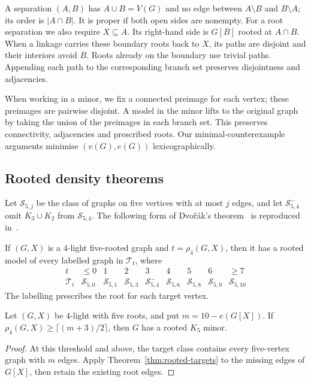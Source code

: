 A separation $(A,B)$ has $A\cup B=V(G)$ and no edge between
$A\setminus B$ and $B\setminus A$; its order is $|A\cap B|$.
It is proper if both open sides are nonempty. For a root separation
we also require $X\subseteq A$. Its right-hand side is $G[B]$
rooted at $A\cap B$. When a linkage carries these boundary roots
back to $X$, its paths are disjoint and their interiors avoid $B$.
Roots already on the boundary use trivial paths. Appending each path
to the corresponding branch set preserves disjointness and adjacencies.

When working in a minor, we fix a connected preimage for each vertex;
these preimages are pairwise disjoint. A model in the minor lifts to
the original graph by taking the union of the preimages in each branch
set. This preserves connectivity, adjacencies and prescribed roots.
Our minimal-counterexample arguments minimise $(v(G),e(G))$
lexicographically.

\subsection{Rooted density theorems}
Let $\mathcal S_{5,j}$ be the class of graphs on five vertices with
at most $j$ edges, and let $\mathcal S_{5,4}^{-}$ omit
$K_3\mathbin{\dot\cup}K_2$ from $\mathcal S_{5,4}$.
The following form of Dvo\v r\'ak's theorem~\cite[Theorem~4]{Dvorak2026}
is reproduced in~\cite[Theorem~2.6]{DNR2026}.

\begin{theorem}\label{thm:rooted-targets}
If $(G,X)$ is a $4$-light five-rooted graph and $t=\rho_4(G,X)$,
then it has a rooted model of every labelled graph in $\mathcal T_t$,
where
\[
\begin{array}{c|cccccccc}
t&\leq0&1&2&3&4&5&6&\geq7\\ \hline
\mathcal T_t&\mathcal S_{5,0}&\mathcal S_{5,1}&\mathcal S_{5,3}&
\mathcal S_{5,4}^{-}&\mathcal S_{5,6}&\mathcal S_{5,8}&
\mathcal S_{5,9}&\mathcal S_{5,10}
\end{array}
\]
The labelling prescribes the root for each target vertex.
\end{theorem}

\begin{corollary}\label{thm:rooted-clique}
Let $(G,X)$ be $4$-light with five roots, and put $m=10-e(G[X])$.
If $\rho_4(G,X)\geq\lceil(m+3)/2\rceil$, then $G$ has a rooted
$K_5$ minor.
\end{corollary}
\begin{proof}
At this threshold and above, the target class contains every
five-vertex graph with $m$ edges. Apply
Theorem~\ref{thm:rooted-targets} to the missing edges of $G[X]$,
then retain the existing root edges.
\end{proof}

